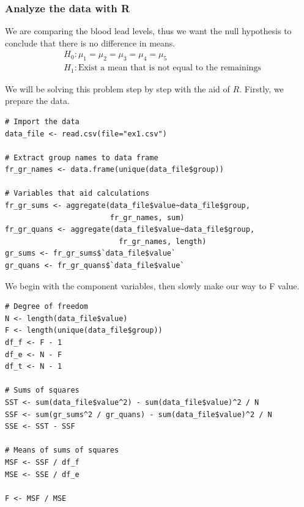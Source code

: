 \documentclass[a4paper]{article}
\numberwithin{equation}{section}
\begin{document}
\subsubsection{Analyze the data with R}
We are comparing the blood lead levels, thus we want the null hypothesis to conclude that there is no difference in means.
\begin{align*}
   & H_0: \mu_1 = \mu_2 = \mu_3 = \mu_4 = \mu_5                   \\
   & H_1: \text{Exist a mean that is not equal to the remainings}
\end{align*}

We will be solving this problem step by step with the aid of \(R\).
Firstly, we prepare the data.
\begin{mdframed}[leftline=false,rightline=false,backgroundcolor=magenta!10,nobreak=true]
  \begin{verbatim}
# Import the data
data_file <- read.csv(file="ex1.csv")

# Extract group names to data frame
fr_gr_names <- data.frame(unique(data_file$group))

# Variables that aid calculations
fr_gr_sums <- aggregate(data_file$value~data_file$group,
                        fr_gr_names, sum)
fr_gr_quans <- aggregate(data_file$value~data_file$group,
                          fr_gr_names, length)
gr_sums <- fr_gr_sums$`data_file$value`
gr_quans <- fr_gr_quans$`data_file$value`
  \end{verbatim}
\end{mdframed}

We begin with the component variables, then slowly make our way to F value.
\begin{mdframed}[leftline=false,rightline=false,backgroundcolor=magenta!10,nobreak=true]
  \begin{verbatim}
# Degree of freedom
N <- length(data_file$value)
F <- length(unique(data_file$group))
df_f <- F - 1
df_e <- N - F
df_t <- N - 1

# Sums of squares
SST <- sum(data_file$value^2) - sum(data_file$value)^2 / N
SSF <- sum(gr_sums^2 / gr_quans) - sum(data_file$value)^2 / N
SSE <- SST - SSF

# Means of sums of squares
MSF <- SSF / df_f
MSE <- SSE / df_e

F <- MSF / MSE
  \end{verbatim}
\end{mdframed}
\end{document}
